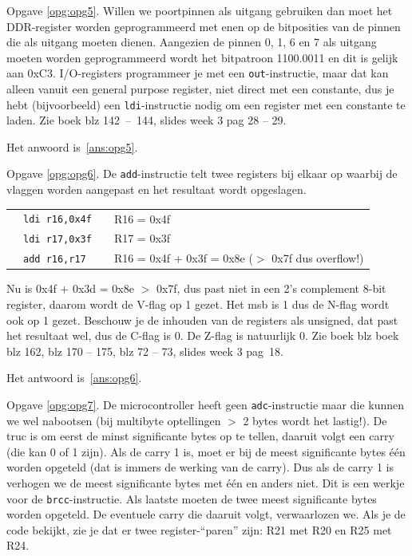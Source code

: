 \documentclass[a4paper,12pt,fleqn,dutch,mimicwordtwentyten]{tisdexam}
\begin{document}
\begin{questions}
\vspace{1em}
Opgave \ref{opg:opg5}.\label{sol:opg5}
Willen we poortpinnen als uitgang gebruiken dan moet het DDR-register worden
geprogrammeerd met enen op de bitposities van de pinnen die als uitgang moeten
dienen. Aangezien de pinnen 0, 1, 6 en 7 als uitgang moeten worden
geprogrammeerd wordt het bitpatroon 1100.0011 en dit is gelijk aan 0xC3.
I/O-registers programmeer je met een \texttt{out}-instructie, maar dat kan
alleen vanuit een general purpose register, niet direct met een constante, dus
je hebt (bijvoorbeeld) een \texttt{ldi}-instructie nodig om een register met
een constante te laden. Zie boek blz 142~--~144, slides week 3 pag 28 -- 29.

Het anwoord is~\ref{ans:opg5}.

\vspace{1em}
Opgave \ref{opg:opg6}.\label{sol:opg6}
De \texttt{add}-instructie telt twee registers bij elkaar op waarbij de
vlaggen worden aangepast en het resultaat wordt opgeslagen.

\begin{table}[h!]
	\begin{tabular}{l l l l}
		 & \texttt{ldi r16,0x4f}   &  &  R16 = 0x4f  \\ 
	 	 & \texttt{ldi r17,0x3f}   &  &  R17 = 0x3f  \\ 
		 & \texttt{add r16,r17}    &  &  R16 = 0x4f + 0x3f = 0x8e ($>$ 0x7f dus overflow!) \\ 
	\end{tabular} 
\end{table}

Nu is 0x4f + 0x3d = 0x8e $>$ 0x7f, dus past niet in een 2's complement 8-bit
register, daarom wordt de V-flag op 1 gezet. Het msb is 1 dus de N-flag wordt
ook op 1 gezet. Beschouw je de inhouden van de registers als unsigned, dat past
het resultaat wel, dus de C-flag is 0. De Z-flag is natuurlijk 0. Zie boek
blz boek blz 162, blz 170 -- 175, blz 72 -- 73, slides week 3 pag~18.

Het antwoord is~\ref{ans:opg6}.

\vspace{1em}
Opgave \ref{opg:opg7}.\label{sol:opg7}
De microcontroller heeft geen \texttt{adc}-instructie maar die
kunnen we wel nabootsen (bij multibyte optellingen $>$ 2 bytes wordt het
lastig!). De truc is om eerst de minst significante bytes op te tellen,
daaruit volgt een carry (die kan 0 of 1 zijn). Als de carry 1 is, moet er
bij de meest significante bytes \'{e}\'{e}n worden opgeteld (dat is immers de
werking van de carry). Dus als de carry 1 is verhogen we de meest significante
bytes met \'{e}\'{e}n en anders niet. Dit is een werkje voor de
\texttt{brcc}-instructie. Als laatste moeten de twee meest significante bytes
worden opgeteld. De eventuele carry die daaruit volgt, verwaarlozen we. Als je
de code bekijkt, zie je dat er twee register-``paren'' zijn: R21 met R20 en R25
met R24.


\end{questions}
\end{document}
